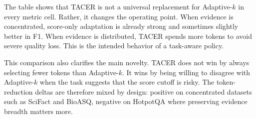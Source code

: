 \documentclass[11pt]{article}
\begin{document}
\begin{table}[t]
\centering
\small
\caption{Direct comparison between TACER and Adaptive-$k$. Positive F1 delta favors TACER; positive reduction delta means TACER saves more tokens.}
\label{tab:tacer_vs_adaptive}
\end{table}

The table shows that TACER is not a universal replacement for Adaptive-$k$ in every metric cell. Rather, it changes the operating point. When evidence is concentrated, score-only adaptation is already strong and sometimes slightly better in F1. When evidence is distributed, TACER spends more tokens to avoid severe quality loss. This is the intended behavior of a task-aware policy.

This comparison also clarifies the main novelty. TACER does not win by always selecting fewer tokens than Adaptive-$k$. It wins by being willing to disagree with Adaptive-$k$ when the task suggests that the score cutoff is risky. The token-reduction deltas are therefore mixed by design: positive on concentrated datasets such as SciFact and BioASQ, negative on HotpotQA where preserving evidence breadth matters more.
\end{document}
